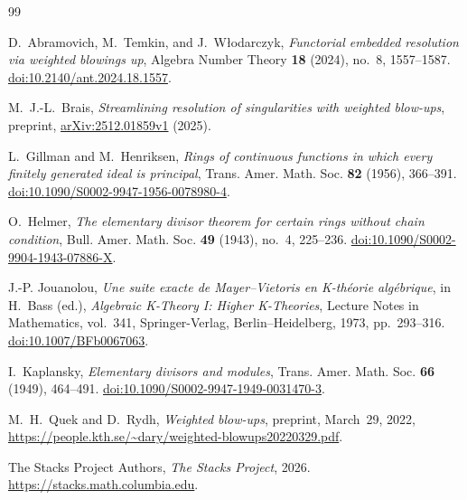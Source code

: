 \documentclass[11pt]{amsart}
\numberwithin{equation}{section}
\theoremstyle{definition}
\begin{document}
\begin{thebibliography}{99}

 D.~Abramovich, M.~Temkin, and J.~W{\l}odarczyk, \emph{Functorial embedded resolution via weighted blowings up}, Algebra Number Theory \textbf{18} (2024), no.~8, 1557--1587. \href{https://doi.org/10.2140/ant.2024.18.1557}{doi:10.2140/ant.2024.18.1557}.

 M.~J.-L.~Brais, \emph{Streamlining resolution of singularities with weighted blow-ups}, preprint, \href{https://arxiv.org/abs/2512.01859v1}{arXiv:2512.01859v1} (2025).

 L.~Gillman and M.~Henriksen, \emph{Rings of continuous functions in which every finitely generated ideal is principal}, Trans. Amer. Math. Soc. \textbf{82} (1956), 366--391. \href{https://doi.org/10.1090/S0002-9947-1956-0078980-4}{doi:10.1090/S0002-9947-1956-0078980-4}.

 O.~Helmer, \emph{The elementary divisor theorem for certain rings without chain condition}, Bull. Amer. Math. Soc. \textbf{49} (1943), no.~4, 225--236. \href{https://doi.org/10.1090/S0002-9904-1943-07886-X}{doi:10.1090/S0002-9904-1943-07886-X}.

 J.-P. Jouanolou, \emph{Une suite exacte de Mayer--Vietoris en K-th\'eorie alg\'ebrique}, in H.~Bass (ed.), \emph{Algebraic K-Theory I: Higher K-Theories}, Lecture Notes in Mathematics, vol.~341, Springer-Verlag, Berlin--Heidelberg, 1973, pp.~293--316. \href{https://doi.org/10.1007/BFb0067063}{doi:10.1007/BFb0067063}.

 I.~Kaplansky, \emph{Elementary divisors and modules}, Trans. Amer. Math. Soc. \textbf{66} (1949), 464--491. \href{https://doi.org/10.1090/S0002-9947-1949-0031470-3}{doi:10.1090/S0002-9947-1949-0031470-3}.

 M.~H.~Quek and D.~Rydh, \emph{Weighted blow-ups}, preprint, March~29, 2022, \url{https://people.kth.se/~dary/weighted-blowups20220329.pdf}.

 The Stacks Project Authors, \emph{The Stacks Project}, 2026. \url{https://stacks.math.columbia.edu}.

\end{thebibliography}
\end{document}
